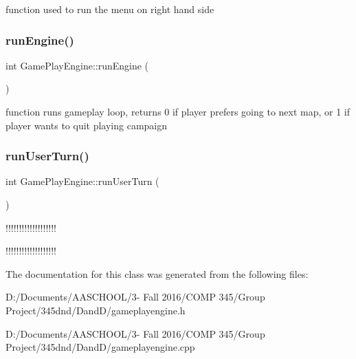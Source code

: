 function used to run the menu on right hand side \hypertarget{class_game_play_engine_a5c155091580329513e92d395b11d4940}{}\label{class_game_play_engine_a5c155091580329513e92d395b11d4940} 
\subsubsection{\texorpdfstring{run\+Engine()}{runEngine()}}
{\footnotesize\ttfamily int Game\+Play\+Engine\+::run\+Engine (\begin{DoxyParamCaption}{ }\end{DoxyParamCaption})}

function runs gameplay loop, returns 0 if player prefers going to next map, or 1 if player wants to quit playing campaign \hypertarget{class_game_play_engine_a80c31e7321cd07272b61291c27e31592}{}\label{class_game_play_engine_a80c31e7321cd07272b61291c27e31592} 
\subsubsection{\texorpdfstring{run\+User\+Turn()}{runUserTurn()}}
{\footnotesize\ttfamily int Game\+Play\+Engine\+::run\+User\+Turn (\begin{DoxyParamCaption}{ }\end{DoxyParamCaption})}

!!!!!!!!!!!!!!!!!!!

!!!!!!!!!!!!!!!!!!! 

The documentation for this class was generated from the following files\+:\begin{DoxyCompactItemize}
\item 
D\+:/\+Documents/\+A\+A\+S\+C\+H\+O\+O\+L/3-\/ Fall 2016/\+C\+O\+M\+P 345/\+Group Project/345dnd/\+Dand\+D/gameplayengine.\+h\item 
D\+:/\+Documents/\+A\+A\+S\+C\+H\+O\+O\+L/3-\/ Fall 2016/\+C\+O\+M\+P 345/\+Group Project/345dnd/\+Dand\+D/gameplayengine.\+cpp\end{DoxyCompactItemize}

